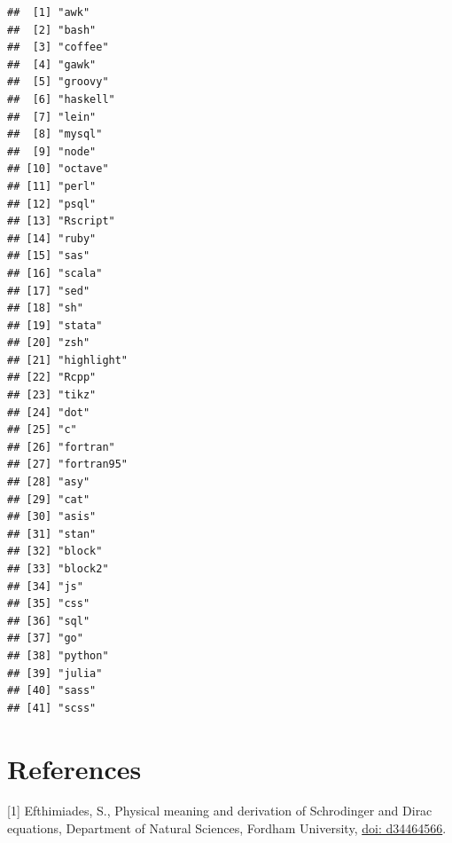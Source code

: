 \documentclass[article]{article}
\newenvironment{Shaded}{\begin{snugshade}}{\end{snugshade}}
\newcommand{\KeywordTok}[1]{\textcolor[rgb]{0.13,0.29,0.53}{\textbf{#1}}}
\newcommand{\OperatorTok}[1]{\textcolor[rgb]{0.81,0.36,0.00}{\textbf{#1}}}
\newcommand{\NormalTok}[1]{#1}
\begin{document}
\begin{Shaded}
\end{Shaded}

\begin{verbatim}
##  [1] "awk"      
##  [2] "bash"     
##  [3] "coffee"   
##  [4] "gawk"     
##  [5] "groovy"   
##  [6] "haskell"  
##  [7] "lein"     
##  [8] "mysql"    
##  [9] "node"     
## [10] "octave"   
## [11] "perl"     
## [12] "psql"     
## [13] "Rscript"  
## [14] "ruby"     
## [15] "sas"      
## [16] "scala"    
## [17] "sed"      
## [18] "sh"       
## [19] "stata"    
## [20] "zsh"      
## [21] "highlight"
## [22] "Rcpp"     
## [23] "tikz"     
## [24] "dot"      
## [25] "c"        
## [26] "fortran"  
## [27] "fortran95"
## [28] "asy"      
## [29] "cat"      
## [30] "asis"     
## [31] "stan"     
## [32] "block"    
## [33] "block2"   
## [34] "js"       
## [35] "css"      
## [36] "sql"      
## [37] "go"       
## [38] "python"   
## [39] "julia"    
## [40] "sass"     
## [41] "scss"
\end{verbatim}

\section{References}\label{references}

{[}1{]} Efthimiades, S., Physical meaning and derivation of Schrodinger
and Dirac equations, Department of Natural Sciences, Fordham University,
\href{https://arxiv.org/vc/quant-ph/papers/0607/0607001v1.pdf}{doi:
d34464566}.
\end{document}

